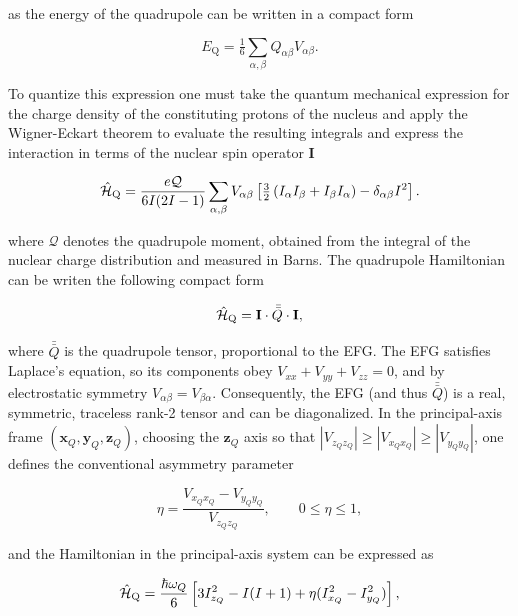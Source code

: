 as the energy of the quadrupole can be written in a compact form

\begin{equation}
    E_\text{Q} = \tfrac16 \sum_{\alpha, \beta} Q_{\alpha \beta} V_{\alpha \beta}.
\end{equation}

To quantize this expression one must take the quantum mechanical expression for the charge density of the constituting protons of the nucleus and apply the Wigner-Eckart theorem to evaluate the resulting integrals and express the interaction in terms of the nuclear spin operator $\mathbf{I}$ 

\begin{equation}
\hat{\mathcal{H}}_{\text{Q}} = \frac{e\mathcal{Q}}{6I(2I-1)} 
\sum_{\alpha,\beta} V_{\alpha\beta} 
\left[ \tfrac{3}{2} \left( I_{\alpha} I_{\beta} + I_{\beta} I_{\alpha} \right) 
- \delta_{\alpha\beta} I^{2} \right].
\label{eq:quadrupole}
\end{equation}

where $\mathcal{Q}$ denotes the quadrupole moment, obtained from the integral of the nuclear charge distribution and measured in Barns. The quadrupole Hamiltonian can be writen the following compact form

\begin{equation}
    \hat{\mathcal{H}}_{\text{Q}} = \mathbf{I} \cdot \bar{\bar{Q}} \cdot \mathbf{I},
\end{equation}

\noindent where $\bar{\bar{Q}}$ is the quadrupole tensor, proportional to the EFG. The EFG satisfies Laplace's equation, so its components obey $V_{xx}+V_{yy}+V_{zz}=0$, and by electrostatic symmetry $V_{\alpha\beta}=V_{\beta\alpha}$. Consequently, the EFG (and thus $\bar{\bar{Q}}$) is a real, symmetric, traceless rank-2 tensor and can be diagonalized. In the principal-axis frame $(\mathbf{x}_Q,\mathbf{y}_Q,\mathbf{z}_Q)$, choosing the $\mathbf{z}_Q$ axis so that $|V_{z_Qz_Q}|\ge|V_{x_Qx_Q}|\ge|V_{y_Qy_Q}|$, one defines the conventional asymmetry parameter

\begin{equation}
    \eta = \frac{V_{x_Qx_Q}-V_{y_Qy_Q}}{V_{z_Qz_Q}}, \qquad 0\leq\eta\leq1,
\end{equation}

\noindent and the Hamiltonian in the principal-axis system can be expressed as

\begin{equation}
\hat{\mathcal{H}}_{\text{Q}} = \frac{\hbar \omega_Q}{6}\left[ 3 I_{z_Q}^2 - I(I+1) + \eta(I_{x_Q}^2 - I_{y_Q}^2)\right],
\end{equation}

